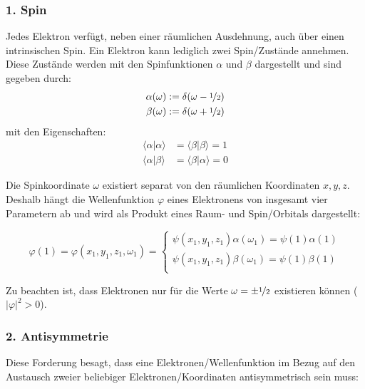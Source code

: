 \cite[S. 265, 270]{levine_2019}

\subsubsection*{1. Spin}
Jedes Elektron verfügt, neben einer räumlichen Ausdehnung, 
auch über einen intrinsischen Spin. 
Ein Elektron kann lediglich zwei Spin\-/Zustände annehmen.
Diese Zustände werden mit den Spinfunktionen $\alpha$ und $\beta$ dargestellt und sind gegeben durch:
\begin{equation}\label{spin_function}
  \begin{aligned}
    \alpha(\omega) &:= \delta(\omega - \nicefrac{1}{2})\\
    \beta(\omega) &:= \delta(\omega + \nicefrac{1}{2})
  \end{aligned}
\end{equation}
mit den Eigenschaften:
\begin{equation}\label{spin_product}
  \begin{aligned}
    \langle \alpha \vert \alpha \rangle &= \langle \beta \vert \beta \rangle = 1 \\
    \langle \alpha \vert \beta \rangle &= \langle \beta \vert \alpha \rangle = 0
  \end{aligned}
\end{equation}

Die Spinkoordinate $\omega$ existiert separat von den räumlichen Koordinaten $x,y,z$.
Deshalb hängt die Wellenfunktion $\varphi$ eines Elektronens von insgesamt vier Parametern ab
und wird als Produkt eines Raum- und Spin\-/Orbitals dargestellt:

\begin{equation}\label{spin}
  \varphi(1) = \varphi(x_1, y_1, z_1, \omega_1) = \begin{cases}
    \psi(x_1, y_1, z_1) \alpha(\omega_1) = \psi(1) \alpha(1)\\
    \psi(x_1, y_1, z_1) \beta(\omega_1) = \psi(1) \beta(1)\\
  \end{cases}
\end{equation}

Zu beachten ist, dass Elektronen nur für die Werte 
$\omega = \pm \nicefrac{1}{2}$ existieren können ($\lvert \varphi \rvert^2 > 0$).

\cite[S. 45]{szabo_ostlund_1996}

\subsubsection*{2. Antisymmetrie}
Diese Forderung besagt, dass eine Elektronen\-/Wellenfunktion im Bezug auf
den Austausch zweier beliebiger Elektronen\-/Koordinaten antisymmetrisch sein muss:


